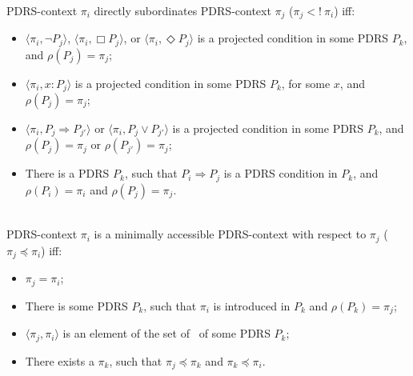 \begin{subdefinition}~\\
PDRS-context $\pi_i$ directly subordinates PDRS-context $\pi_j$ 
($\pi_j <!~\pi_i$) iff:
  \begin{itemize}
    \item $\langle\pi_i,\neg P_j\rangle$,
      $\langle\pi_i,\Box P_j\rangle$,
      or $\langle\pi_i,\Diamond P_j\rangle$ is a projected condition in
      some PDRS $P_k$, and $\rho(P_j) = \pi_j$;
    \item $\langle\pi_i,x:P_j\rangle$ is a projected condition in some
      PDRS $P_k$, for some $x$, and $\rho(P_j) = \pi_j$;
    \item  $\langle\pi_i,P_j \Rightarrow P_{j'}\rangle$ or
      $\langle\pi_i,P_j \vee P_{j'}\rangle$ is a projected condition in
      some PDRS $P_k$, and $\rho(P_j) = \pi_j$ or $\rho(P_{j'}) = \pi_j$;
    \item There is a PDRS $P_k$, such that $P_i \Rightarrow P_j$ is a PDRS
      condition in $P_k$, and $\rho(P_i) = \pi_i$ and $\rho(P_j) = \pi_j$.
  \end{itemize}
\end{subdefinition}

\begin{subdefinition}~\\
PDRS-context $\pi_i$ is a minimally accessible PDRS-context with
respect to $\pi_j$ ($\pi_j \preceq \pi_i$) iff:
  \begin{itemize}
    \item $\pi_j = \pi_i$;
    \item There is some PDRS $P_k$, such that $\pi_i$ is introduced in $P_k$
      and $\rho(P_k)=\pi_j$;
    \item $\langle \pi_j,\pi_i\rangle$ is an element of the set of
      \MAPs~of some PDRS $P_k$;
    \item There exists a $\pi_k$, such that $\pi_j \preceq \pi_k$ and $\pi_k \preceq \pi_i$.
  \end{itemize}
\end{subdefinition}

